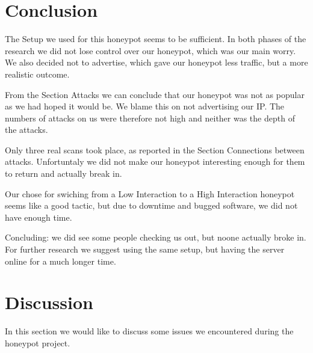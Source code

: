 \documentclass[11pt]{article}
\begin{document}
\section{Conclusion}
\label{Conclusion}
The Setup we used for this honeypot seems to be sufficient. In both phases of the research we did not lose control over our honeypot, which was our main worry. We also decided not to advertise, which gave our honeypot less traffic, but a more realistic outcome.

From the Section Attacks we can conclude that our honeypot was not as popular as we had hoped it would be. We blame this on not advertising our IP. The numbers of attacks on us were therefore not high and neither was the depth of the attacks.

Only three real scans took place, as reported in the Section Connections between attacks. Unfortuntaly we did not make our honeypot interesting enough for them to return and actually break in.

Our chose for swiching from a Low Interaction to a High Interaction honeypot seems like a good tactic, but due to downtime and bugged software, we did not have enough time.

Concluding: we did see some people checking us out, but noone actually broke in. For further research we suggest using the same setup, but having the server online for a much longer time.

\section{Discussion}
\label{Discussion}
In this section we would like to discuss some issues we encountered during the honeypot project. 
\end{document}
